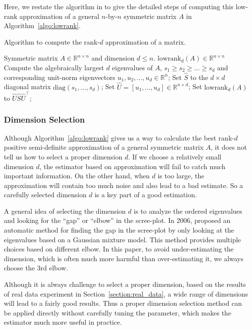 \documentclass[a4paper]{article}
\renewcommand{\hat}{\widehat}
\begin{document}
Here, we restate the algorithm in \citep{tang2016law} to give the detailed steps of computing this low-rank approximation of a general $n$-by-$n$ symmetric matrix $A$ in Algorithm~\ref{algo:lowrank}.
\begin{algorithm}[H]
\caption{Algorithm to compute the rank-$d$ approximation of a matrix.}
\label{algo:lowrank}
\begin{algorithmic}[1]
\REQUIRE Symmetric matrix $A\in \mathbb{R}^{n \times n}$ and dimension $d\leq n$.
\ENSURE $\mathrm{lowrank}_d(A)\in \mathbb{R}^{n \times n}$
\STATE Compute the algebraically largest $d$ eigenvalues of $A$, $s_1\geq s_2\ge \dotsc \ge s_d$ and corresponding unit-norm eigenvectors $u_1,u_2,\dotsc,u_d\in \mathbb{R}^n$;
\STATE Set $\hat{S}$ to the $d\times d$ diagonal matrix $\mathrm{diag}(s_1,\dotsc,s_d)$;
\STATE Set $\hat{U} = [u_1,\dotsc,u_d]\in \mathbb{R}^{n \times d}$;
\STATE Set $\mathrm{lowrank}_d(A)$ to $\hat{U}\hat{S}\hat{U}^{\top}$;
\end{algorithmic}
\end{algorithm}


\subsubsection{Dimension Selection}
\label{section:dim_select}

Although Algorithm~\ref{algo:lowrank} gives us a way to calculate the best rank-$d$ positive semi-definite approximation of a general symmetric matrix $A$, it does not tell us how to select a proper dimension $d$. If we choose a relatively small dimension $d$, the estimator based on approximation will fail to catch much important information. On the other hand, when $d$ is too large, the approximation will contain too much noise and also lead to a bad estimate. So a carefully selected dimension $d$ is a key part of a good estimation.

A general idea of selecting the dimension $d$ is to analyze the ordered eigenvalues and looking for the ``gap'' or ``elbow'' in the scree-plot.
In 2006, \citet{zhu2006automatic} proposed an automatic method for finding the gap in the scree-plot by only looking at the eigenvalues based on a Gaussian mixture model. This method provides multiple choices based on different elbow. In this paper, to avoid under-estimating the dimension, which is often much more harmful than over-estimating it, we always choose the 3rd elbow.

Although it is always challenge to select a proper dimension, based on the results of real data experiment in Section~\ref{section:real_data}, a wide range of dimensions will lead to a fairly good results. Thus a proper dimension selection method can be applied directly without carefully tuning the parameter, which makes the estimator much more useful in practice.
\end{document}
